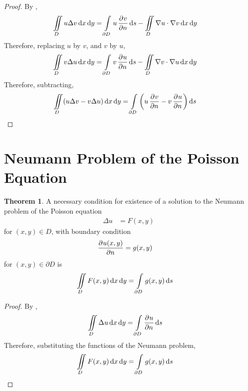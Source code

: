\documentclass[titlepage, fleqn, a4paper, 12pt, twoside]{article}
\theoremstyle{definition}
\theoremstyle{theorem}
\newtheorem{theorem}{Theorem}
\begin{document}
\begin{proof}
	By ,
	\begin{align*}
		\iint\limits_{D} u \Delta v \dif x \dif y & = \int\limits_{\partial D} u \dpd{v}{n} \dif s - \iint\limits_{D} \nabla u \cdot \nabla v \dif x \dif y
	\end{align*}
	Therefore, replacing $u$ by $v$, and $v$ by $u$,
	\begin{align*}
		\iint\limits_{D} v \Delta u \dif x \dif y & = \int\limits_{\partial D} v \dpd{u}{n} \dif s - \iint\limits_{D} \nabla v \cdot \nabla u \dif x \dif y
	\end{align*}
	Therefore, subtracting,
	\begin{align*}
		\iint\limits_{D} (u \Delta v - v \Delta u) \dif x \dif y & = \int\limits_{\partial D} \left( u \dpd{v}{n} - v \dpd{u}{n} \right) \dif s
	\end{align*}
\end{proof}

\section{Neumann Problem of the Poisson Equation}

\begin{theorem}
	A necessary condition for existence of a solution to the Neumann problem of the Poisson equation
	\begin{align*}
		\Delta u & = F(x,y)
	\end{align*}
	for $(x,y) \in D$, with boundary condition
	\begin{align*}
		\dpd{u(x,y)}{n} & = g(x,y)
	\end{align*}
	for $(x,y) \in \partial D$ is
	\begin{align*}
		\iint\limits_{D} F(x,y) \dif x \dif y & = \int\limits_{\partial D} g(x,y) \dif s
	\end{align*}
\end{theorem}

\begin{proof}
	By ,
	\begin{align*}
		\iint\limits_{D} \Delta u \dif x \dif y & = \int\limits_{\partial D} \dpd{u}{n} \dif s
	\end{align*}
	Therefore, substituting the functions of the Neumann problem,
	\begin{align*}
		\iint\limits_{D} F(x,y) \dif x \dif y & = \int\limits_{\partial D} g(x,y) \dif s
	\end{align*}
\end{proof}
\end{document}

